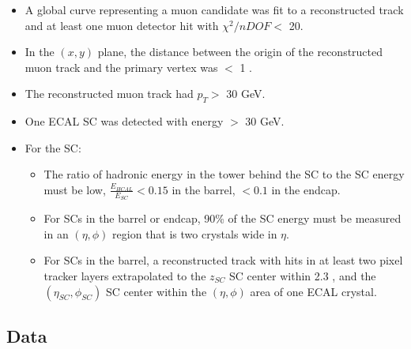 \begin{itemize}
	\item A global curve representing a muon candidate was fit to a reconstructed track and at least one muon detector hit with $\chi^{2}/nDOF <$ 20.
	\item In the $(x,y)$ plane, the distance between the origin of the reconstructed muon track and the primary vertex was $<$ 1 \mm.
	\item The reconstructed muon track had $p_{T} >$ 30 GeV.
	\item One ECAL SC was detected with energy $>$ 30 GeV.
	\item For the SC:
	\begin{itemize}
		\item The ratio of hadronic energy in the tower behind the SC to the SC energy must be low, $\frac{E_{HCAL}}{E_{SC}} < 0.15$ in the barrel, $< 0.1$ in the endcap.
		\item For SCs in the barrel or endcap, 90\% of the SC energy must be measured in an $(\eta, \phi)$ region that is two crystals wide in $\eta$.
		\item For SCs in the barrel, a reconstructed track with hits in at least two pixel tracker layers extrapolated to the 
			$z_{SC}$ SC center within 2.3 \cm, and the $(\eta_{SC}, \phi_{SC})$ SC center within the $(\eta, \phi)$ area of one ECAL crystal.
	\end{itemize}
\end{itemize}


\subsection{Data}
\label{sec:collisionData}

